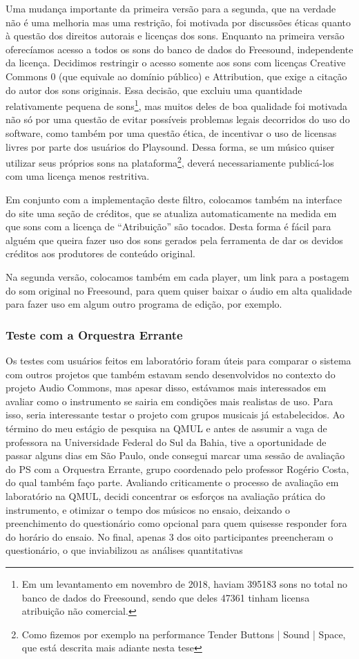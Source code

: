 Uma mudança importante da primeira versão para a segunda, que na verdade não é uma melhoria mas uma restrição, foi motivada por discussões éticas quanto à questão dos direitos autorais e licenças dos sons. Enquanto na primeira versão oferecíamos acesso a todos os sons do banco de dados do Freesound, independente da licença. Decidimos restringir o acesso somente aos sons com licenças Creative Commons 0 (que equivale ao domínio público) e Attribution, que exige a citação do autor dos sons originais. Essa decisão, que excluiu uma quantidade relativamente pequena de sons\footnote{Em um levantamento em novembro de 2018, haviam 395183 sons no total no banco de dados do Freesound, sendo que deles 47361 tinham licensa atribuição não comercial.}, mas muitos deles de boa qualidade foi motivada não só por uma questão de evitar possíveis problemas legais decorridos do uso do software, como também por uma questão ética, de incentivar o uso de licensas livres por parte dos usuários do Playsound. Dessa forma, se um músico quiser utilizar seus próprios sons na plataforma\footnote{Como fizemos por exemplo na performance Tender Buttons | Sound | Space, que está descrita mais adiante nesta tese}, deverá necessariamente publicá-los com uma licença menos restritiva. 

Em conjunto com a implementação deste filtro, colocamos também na interface do site uma seção de créditos, que se atualiza automaticamente na medida em que sons com a licença de ``Atribuição'' são tocados. Desta forma é fácil para alguém que queira fazer uso dos sons gerados pela ferramenta de dar os devidos créditos aos produtores de conteúdo original. 

Na segunda versão, colocamos também em cada player, um link para a postagem do som original no Freesound, para quem quiser baixar o áudio em alta qualidade para fazer uso em algum outro programa de edição, por exemplo. 



\subsubsection{Teste com a Orquestra Errante}
Os testes com usuários feitos em laboratório foram úteis para comparar o sistema com outros projetos que também estavam sendo desenvolvidos no contexto do projeto Audio Commons, mas apesar disso, estávamos mais interessados em avaliar como o instrumento se sairia em condições mais realistas de uso. Para isso, seria interessante testar o projeto com grupos musicais já estabelecidos. Ao término do meu estágio de pesquisa na QMUL e antes de assumir a vaga de professora na Universidade Federal do Sul da Bahia, tive a oportunidade de passar alguns dias em São Paulo, onde consegui marcar uma sessão de avaliação do PS com a Orquestra Errante, grupo coordenado pelo professor Rogério Costa, do qual também faço parte. Avaliando criticamente o processo de avaliação em laboratório na QMUL, decidi concentrar os esforços na avaliação prática do instrumento, e otimizar o tempo dos músicos no ensaio, deixando o preenchimento do questionário como opcional para quem quisesse responder fora do horário do ensaio. No final, apenas 3 dos oito participantes preencheram o questionário, o que inviabilizou as análises quantitativas

